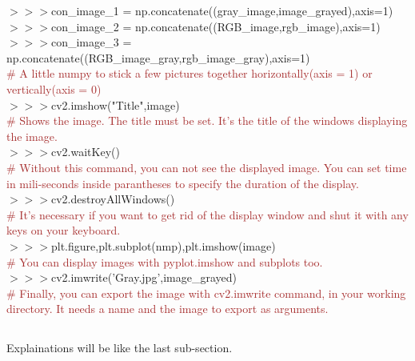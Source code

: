 \documentclass[a4paper,18pt]{article}
\begin{document}
$>>>$con\_image\_1 = np.concatenate((gray\_image,image\_grayed),axis=1)\\
\hspace*{14pt}$>>>$con\_image\_2 = np.concatenate((RGB\_image,rgb\_image),axis=1)\\
\hspace*{14pt}$>>>$con\_image\_3 = np.concatenate((RGB\_image\_gray,rgb\_image\_gray),axis=1)\\{\textcolor{brown}{\# A little numpy to stick a few pictures together horizontally(axis = 1) or vertically(axis = 0)}}\\

$>>>$cv2.imshow("Title",image)\\{\textcolor{brown}{\# Shows the image. The title must be set. It's the title of the windows displaying the image.}}\\

$>>>$cv2.waitKey()\\{\textcolor{brown}{\# Without this command, you can not see the displayed image. You can set time in mili-seconds inside parantheses to specify the duration of the display.}}\\

$>>>$cv2.destroyAllWindows()\\{\textcolor{brown}{\# It's necessary if you want to get rid of the display window and shut it with any keys on your keyboard.}}\\

$>>>$plt.figure,plt.subplot(nmp),plt.imshow(image)\\{\textcolor{brown}{\# You can display images with pyplot.imshow and subplots too.}}\\

$>>>$cv2.imwrite('Gray.jpg',image\_grayed)\\{\textcolor{brown}{\# Finally, you can export the image with cv2.imwrite command, in your working directory. It needs a name and the image to export as arguments.}}\\


\subsection{\colorbox {matgreen}{\color{white}{\large Primary Works on Video}}}
Explainations will be like the last sub-section.\\\\
\end{document}
